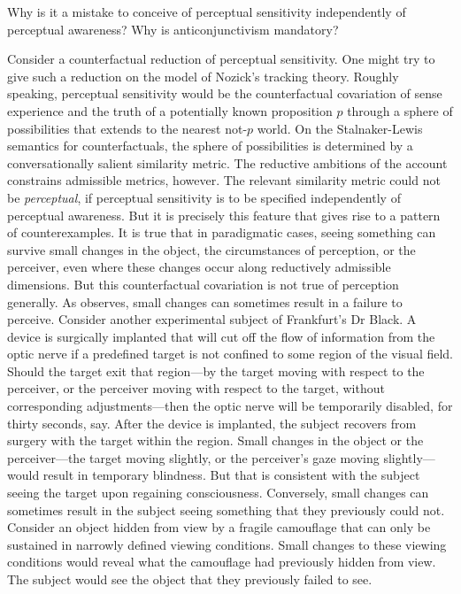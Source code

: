 \documentclass[12pt]{article}
\begin{document}
Why is it a mistake to conceive of perceptual sensitivity independently of perceptual awareness? Why is anticonjunctivism mandatory?

Consider a counterfactual reduction of perceptual sensitivity. One might try to give such a reduction on the model of Nozick's \citeyearpar{Nozick:1981fk} tracking theory. Roughly speaking, perceptual sensitivity would be the counterfactual covariation of sense experience and the truth of a potentially known proposition \( p \) through a sphere of possibilities that extends to the nearest not-\( p \) world. On the Stalnaker-Lewis semantics for counterfactuals, the sphere of possibilities is determined by a conversationally salient similarity metric. The reductive ambitions of the account constrains admissible metrics, however. The relevant similarity metric could not be \emph{perceptual}, if perceptual sensitivity is to be specified independently of perceptual awareness. But it is precisely this feature that gives rise to a pattern of counterexamples. It is true that in paradigmatic cases, seeing something can survive small changes in the object, the circumstances of perception, or the perceiver, even where these changes occur along reductively admissible dimensions. But this counterfactual covariation is not true of perception generally.  As \citet{Johnston:2006uq} observes, small changes can sometimes result in a failure to perceive. Consider another experimental subject of Frankfurt's \citeyearpar{Frankfurt:1969kx} Dr Black. A device is surgically implanted that will cut off the flow of information from the optic nerve if a predefined target is not confined to some region of the visual field. Should the target exit that region---by the target moving with respect to the perceiver, or the perceiver moving with respect to the target, without corresponding adjustments---then the optic nerve will be temporarily disabled, for thirty seconds, say. After the device is implanted, the subject recovers from surgery with the target within the region. Small changes in the object or the perceiver---the target moving slightly, or the perceiver's gaze moving slightly---would result in temporary blindness. But that is consistent with the subject seeing the target upon regaining consciousness. Conversely, small changes can sometimes result in the subject seeing something that they previously could not. Consider an object hidden from view by a fragile camouflage that can only be sustained in narrowly defined viewing conditions. Small changes to these viewing conditions would reveal what the camouflage had previously hidden from view. The subject would see the object that they previously failed to see.
\end{document}
